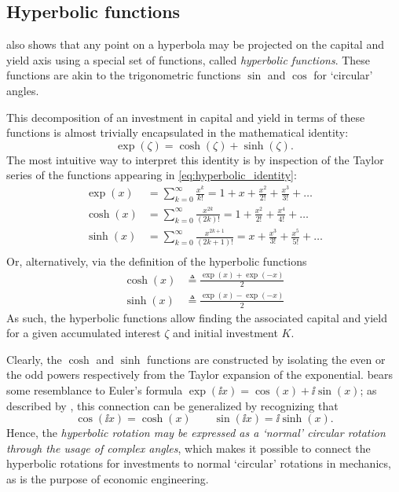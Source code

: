 \subsection{Hyperbolic functions}
 also shows that any point on a hyperbola may be projected on the capital and yield axis using a special set of functions, called \emph{hyperbolic functions}. These functions are akin to the trigonometric functions $\sin$ and $\cos$ for `circular' angles.

This decomposition of an investment in capital and yield in terms of these functions is almost trivially encapsulated in the mathematical identity:
\begin{equation}
    \exp(\zeta) = \cosh(\zeta) + \sinh(\zeta).
    \label{eq:hyperbolic_identity}
\end{equation}
The most intuitive way to interpret this identity is by inspection of the Taylor series of the functions appearing in \cref{eq:hyperbolic_identity}:
\begin{equation}
    \begin{split}
        \exp(x) &= \sum_{k = 0}^\infty \frac{x^k}{k!} = 1 + x + \frac{x^2}{2!} + \frac{x^3}{3!} + \ldots\\
        \cosh(x) &= \sum_{k = 0}^\infty \frac{x^{2k}}{(2k)!} = 1 + \frac{x^2}{2!} + \frac{x^4}{4!} + \ldots\\
        \sinh(x) &= \sum_{k = 0}^\infty \frac{x^{2k + 1}}{(2k + 1)!} = x + \frac{x^3}{3!} + \frac{x^5}{5!} + \ldots\\
    \end{split}
\end{equation}
Or, alternatively, via the definition of the hyperbolic functions
\begin{equation}
    \begin{split}
        \cosh(x) &\triangleq \frac{\exp(x) + \exp(-x)}{2}\\
        \sinh(x) &\triangleq \frac{\exp(x) - \exp(-x)}{2}
    \end{split}
\end{equation}
As such, the hyperbolic functions allow finding the associated capital and yield for a given accumulated interest $\zeta$ and initial investment $K$.

Clearly, the \(\cosh\) and \(\sinh\) functions are constructed by isolating the even or the odd powers respectively from the Taylor expansion of the exponential.  bears some resemblance to Euler's formula \(\exp(\ii x) = \cos(x) + \ii \sin(x)\); as described by \citet{Needham1997}, this connection can be generalized by recognizing that
\begin{equation}
     \cos(\ii x) = \cosh(x) \qquad \sin(\ii x) = \ii\sinh(x).
     \label{eq:trig_functions}
\end{equation}
Hence, the \emph{hyperbolic rotation may be expressed as a `normal' circular rotation through the usage of complex angles}, which makes it possible to connect the hyperbolic rotations for investments to normal `circular' rotations in mechanics, as is the purpose of economic engineering.

